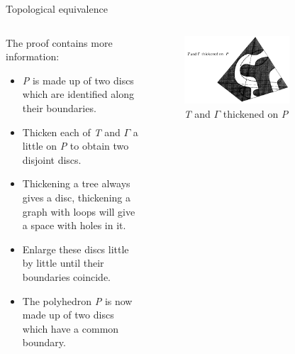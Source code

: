 \documentclass{beamer}
\begin{document}
\begin{frame}{Topological equivalence}
  \begin{columns}
    \begin{column}{0.6\textwidth}
      \begin{block}{}
        The proof contains more information:
        \begin{itemize}
        \item \textsl{P} is made up of two discs which are identified along their boundaries.
        \item Thicken each of \textsl{T} and $\Gamma$ a little on \textsl{P} to obtain two disjoint discs.
        \item Thickening a tree always gives a disc, thickening a graph with loops will give a space with holes in it.
        \item Enlarge these discs little by little until their boundaries coincide.
        \item The polyhedron \textsl{P} is now made up of two discs which have a common boundary.
        \end{itemize}
      \end{block}
    \end{column}
    \begin{column}{0.4\textwidth}
      \begin{figure}
        \centering
        \includegraphics[width=0.7\textwidth]{figure_1_6.png}
        \caption{\textsl{T} and $\Gamma$ thickened on \textsl{P}}
      \end{figure}
    \end{column}
  \end{columns}
\end{frame}
\end{document}
